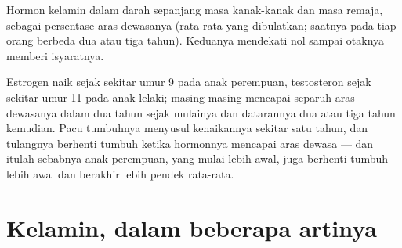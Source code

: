 \begin{omfigure}

{\small Hormon kelamin dalam darah sepanjang masa kanak-kanak dan masa
remaja, sebagai persentase aras dewasanya (rata-rata yang dibulatkan;
saatnya pada tiap orang berbeda dua atau tiga tahun). Keduanya mendekati
nol sampai otaknya memberi isyaratnya.}
\end{omfigure}

\begin{example}\label{ex:g11:becoming-male-female:curves}
Estrogen naik sejak sekitar umur 9 pada anak perempuan, testosteron
sejak sekitar umur 11 pada anak lelaki; masing-masing mencapai separuh
aras dewasanya dalam dua tahun sejak mulainya dan datarannya dua atau
tiga tahun kemudian. Pacu tumbuhnya menyusul kenaikannya sekitar satu
tahun, dan tulangnya berhenti tumbuh ketika hormonnya mencapai aras
dewasa --- dan itulah sebabnya anak perempuan, yang mulai lebih awal,
juga berhenti tumbuh lebih awal dan berakhir lebih pendek rata-rata.
\end{example}

\section{Kelamin, dalam beberapa artinya}

